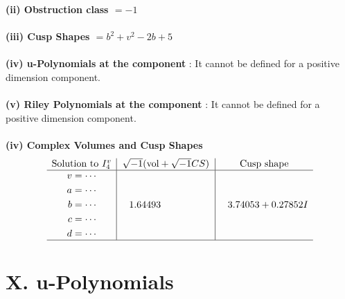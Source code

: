 \documentclass[1p]{elsarticle_modified}
\theoremstyle{definition}
\newcommand{\I}{\sqrt{-1}}
\begin{document}
\flushleft \textbf{(ii) Obstruction class $= -1$}\\~\\
\flushleft \textbf{(iii) Cusp Shapes $= b^2+v^2-2 b+5$}\\~\\
\flushleft \textbf{(iv) u-Polynomials at the component} : It cannot be defined for a positive dimension component.\\~\\
\flushleft \textbf{(v) Riley Polynomials at the component} : It cannot be defined for a positive dimension component.\\~\\
\newpage\flushleft \textbf{(iv) Complex Volumes and Cusp Shapes}
$$\begin{array}{c|c|c} 
\text{Solution to }I^v_{4}& \I (\text{vol} + \sqrt{-1}CS) & \text{Cusp shape}\\
 \hline 
\begin{aligned}
v &= \cdots \\
a &= \cdots \\
b &= \cdots \\
c &= \cdots \\
d &= \cdots\end{aligned}
 & \phantom{-}1.64493\phantom{ +0.000000I} & \phantom{-}3.74053 + 0.27852 I\\
 \hline 
 \end{array}
$$
\newpage\renewcommand{\arraystretch}{1}
\centering \section*{ X. u-Polynomials}
\end{document}
